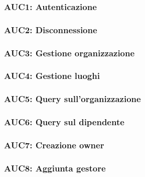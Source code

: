 \documentclass[../analisi-dei-requisiti.tex]{subfiles}
\begin{document}
\subsubsection{AUC1: Autenticazione}%
\label{subs:AUC1}



\subsubsection{AUC2: Disconnessione}%
\label{subs:AUC2}



\subsubsection{AUC3: Gestione organizzazione}%
\label{subs:AUC3}



\subsubsection{AUC4: Gestione luoghi}%
\label{subs:AUC4}



\subsubsection{AUC5: Query sull'organizzazione}%
\label{subs:AUC5}



\subsubsection{AUC6: Query sul dipendente}%
\label{subs:AUC6}



\subsubsection{AUC7: Creazione owner}%
\label{subs:AUC7}



\subsubsection{AUC8: Aggiunta gestore}%
\label{subs:AUC8}
\end{document}
